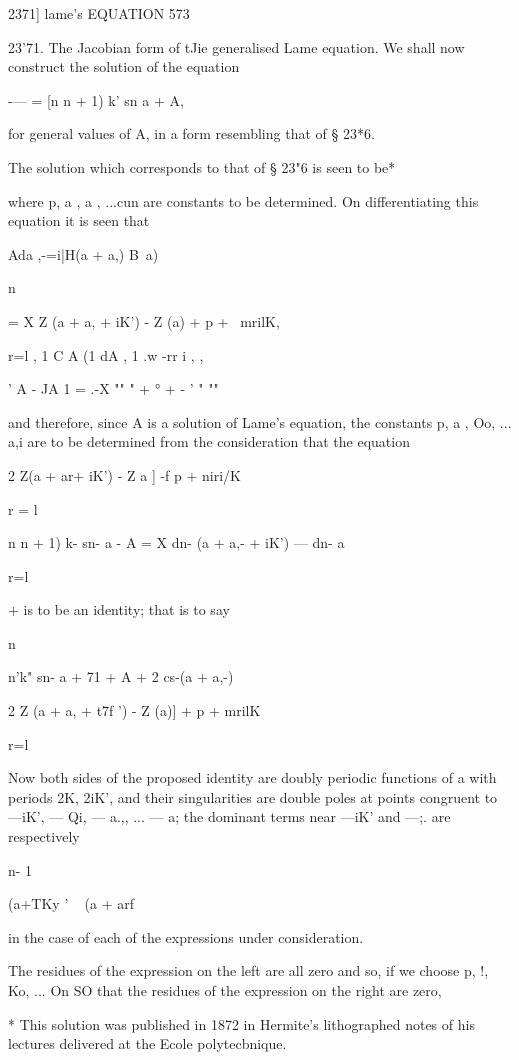 {{{{{{{{2371] lame's EQUATION 573

23'71. The Jacobian form of tJie generalised Lame equation. We shall
now construct the solution of the equation

-— = [n n + 1) k' sn a + A,

for general values of A, in a form resembling that of § 23*6.

The solution which corresponds to that of § 23"6 is seen to be*

where p, a , a , ...cun are constants to be determined. On
differentiating this equation it is seen that

Ada ,-=i|H(a + a,) B\ a)\ \

n

= X Z (a + a, + iK') - Z (a) + p + \ mrilK,

r=l , 1 C A (1 dA , 1 .w -rr i , ,

   ' A - JA 1 = .-X "" " + ° + - ' " ""

and therefore, since A is a solution of Lame's equation, the constants
p, a , Oo, ... a,i are to be determined from the consideration that
the equation

2 Z(a + ar+ iK') - Z a ] -f p + niri/K

r = l

n n + 1) k- sn- a - A = X dn- (a + a,- + iK') — dn- a

r=l

+ is to be an identity; that is to say

n

n'k" sn- a + 71 + A + 2 cs-(a + a,-)

2 Z (a + a, + t7f ') - Z (a)] + p + mrilK

r=l

Now both sides of the proposed identity are doubly periodic functions
of a with periods 2K, 2iK', and their singularities are double poles
at points congruent to —iK', — Qi, — a.,, ... — a; the dominant terms
near —iK' and —;. are respectively

n- 1

(a+TKy ' ~ (a + arf

in the case of each of the expressions under consideration.

The residues of the expression on the left are all zero and so, if we
choose p, !, Ko, ... On SO that the residues of the expression on the
right are zero,

* This solution was published in 1872 in Hermite's lithographed notes
of his lectures delivered at the Ecole polytecbnique.

}}}}}}}}
